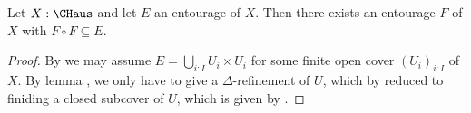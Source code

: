 \begin{theorem}\label{shrinking}
  Let $X:\CHaus$ and let $E$ an entourage of $X$. Then there exists an entourage $F$ of $X$ with $F\circ F \subseteq E$. 
\end{theorem}
\begin{proof}
  By  we may assume $E = \bigcup_{i:I} U_i \times U_i$ for some finite open cover $(U_i)_{i:I}$ of $X$. 
  By lemma , we only have to give a $\Delta$-refinement of $U$, which by  reduced to finiding a closed subcover of $U$, which is given by .
\end{proof}

